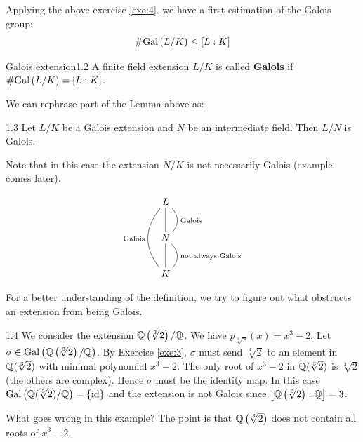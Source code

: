 \documentclass[twoside = false,	%
		headsepline,		%
		parskip = true,
		]{scrbook}						%
\begin{document}
        Applying the above exercise \ref{exe:4}, we have a first estimation of the Galois group:
        \begin{align*}
            \# \mathrm{Gal}\left( L/K\right) \leq [L:K]
        \end{align*}
        
        \begin{definition}{Galois extension}{1.2}
            A finite field extension $L/K$ is called \textbf{Galois} if $\#\mathrm{Gal}\left( L/K\right) = [L:K]$.
        \end{definition}
        We can rephrase part of the Lemma above as:
        
        \begin{corollary}{}{1.3}
            Let $L/K$ be a Galois extension and $N$ be an intermediate field. Then $L/N$ is Galois.
        \end{corollary}
        
        Note that in this case the extension $N/K$ is not necessarily Galois (example comes later).
        
        \begin{equation*}
            \xymatrix
            {
            L\ar@{-}[d]\ar@/_1.5pc/@{-}[dd]_{\text{Galois}}\ar@/^1pc/@{-}[d]^{\text{Galois}} \\
            N\ar@{-}[d]\ar@/^1pc/@{-}[d]^{\text{not always Galois}} \\
            K
            }
        \end{equation*}
        
        For a better understanding of the definition, we try to figure out what obstructs an extension from being Galois.
        \begin{example}{}{1.4}
            We consider the extension $\mathbb Q\left(\sqrt[3]{2}\right)/\mathbb Q$. We have $p_{\sqrt[3]{2}}(x) = x^3-2$. Let $\sigma \in \mathrm{Gal}\left( \mathbb Q\left(\sqrt[3]{2}\right)/\mathbb Q \right)$. By Exercise \ref{exe:3}, $\sigma$ must send $\sqrt[3]{2}$ to an element in $\mathbb Q(\sqrt[3]{2})$ with minimal polynomial $x^3-2$. The only root of $x^3-2$ in $\mathbb Q(\sqrt[3]{2})$ is $\sqrt[3]{2}$ (the others are complex). Hence $\sigma$ must be the identity map. In this case $\mathrm{Gal}\left(  \mathbb Q(\sqrt[3]{2})/\mathbb Q\right) = \{\mathrm{id}\}$ and the extension is not Galois since $\left[\mathbb Q\left(\sqrt[3]{2}\right):\mathbb Q\right]=3$.
        \end{example}
        
        What goes wrong in this example? The point is that $\mathbb Q\left( \sqrt[3]{2}\right)$ does not contain all roots of $x^3-2$.
        
\end{document}
